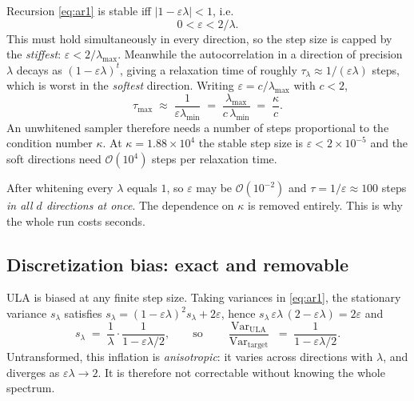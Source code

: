 \documentclass[11pt]{article}
\newcommand{\Var}{\operatorname{Var}}
\begin{document}
Recursion \eqref{eq:ar1} is stable iff $|1-\varepsilon\lambda| < 1$, i.e.
\begin{equation}
  0 < \varepsilon < 2/\lambda .
\end{equation}
This must hold simultaneously in every direction, so the step size is capped by the
\emph{stiffest}: $\varepsilon < 2/\lambda_{\max}$. Meanwhile the autocorrelation in a direction of
precision $\lambda$ decays as $(1-\varepsilon\lambda)^t$, giving a relaxation time of roughly
$\tau_\lambda \approx 1/(\varepsilon\lambda)$ steps, which is worst in the \emph{softest}
direction. Writing $\varepsilon = c/\lambda_{\max}$ with $c<2$,
\begin{equation}
  \tau_{\max} \;\approx\; \frac{1}{\varepsilon \lambda_{\min}}
  \;=\; \frac{\lambda_{\max}}{c\,\lambda_{\min}} \;=\; \frac{\kappa}{c}.
\end{equation}
An unwhitened sampler therefore needs a number of steps proportional to the condition number
$\kappa$. At $\kappa = 1.88\times 10^4$ the stable step size is $\varepsilon < 2\times 10^{-5}$ and
the soft directions need $\mathcal{O}(10^4)$ steps per relaxation time.

After whitening every $\lambda$ equals $1$, so $\varepsilon$ may be $\mathcal{O}(10^{-2})$ and
$\tau = 1/\varepsilon \approx 100$ steps \emph{in all $d$ directions at once}. The dependence on
$\kappa$ is removed entirely. This is why the whole run costs seconds.

\subsection{Discretization bias: exact and removable}

ULA is biased at any finite step size. Taking variances in \eqref{eq:ar1}, the stationary variance
$s_\lambda$ satisfies $s_\lambda = (1-\varepsilon\lambda)^2 s_\lambda + 2\varepsilon$, hence
$s_\lambda\,\varepsilon\lambda\,(2-\varepsilon\lambda) = 2\varepsilon$ and
\begin{equation}
  s_\lambda \;=\; \frac{1}{\lambda}\cdot\frac{1}{1 - \varepsilon\lambda/2},
  \qquad\text{so}\qquad
  \frac{\Var_{\text{ULA}}}{\Var_{\text{target}}} \;=\; \frac{1}{1-\varepsilon\lambda/2}.
  \label{eq:bias}
\end{equation}
Untransformed, this inflation is \emph{anisotropic}: it varies across directions with $\lambda$,
and diverges as $\varepsilon\lambda \to 2$. It is therefore not correctable without knowing the
whole spectrum.
\end{document}
